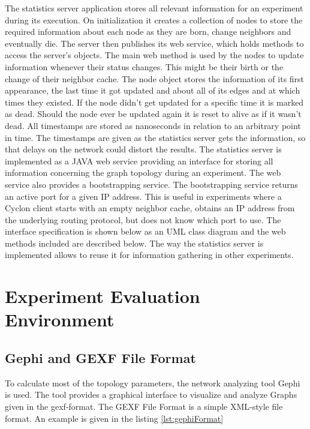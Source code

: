 The statistics server application stores all relevant information for an
experiment during its execution. On initialization it creates a collection of
nodes to store the required information about each node as they are born,
change neighbors and eventually die. The server then publishes its web service,
which holds methods to access the server's objects. The main web method is used
by the nodes to update information whenever their status changes. This might be
their birth or the change of their neighbor cache. The node object stores the
information of its first appearance, the last time it got updated and about all
of its edges and at which times they existed. If the node didn't get updated for
a specific time it is marked as dead. Should the node ever be updated again it is
reset to alive as if it wasn't dead. All timestamps are stored as nanoseconds in
relation to an arbitrary point in time. The timestamps are given as the
statistics server gets the information, so that delays on the network could
distort the results.
The statistics server is implemented as a JAVA web service providing an
interface for storing all information concerning the graph topology during an
experiment. The web service also provides a bootstrapping service. The
bootstrapping service returns an active port for a given IP address. This is
useful in experiments where a Cyclon client starts with an empty neighbor
cache, obtains an IP address from the underlying routing protocol, but does not
know which port to use. The interface specification is shown below
as an UML class diagram and the web methods included are described below.
The way the statistics server is implemented allows to reuse it for information
gathering in other experiments. 

\section{Experiment Evaluation Environment}

\subsection{Gephi and GEXF File Format}
To calculate most of the topology parameters, the network analyzing tool Gephi
\cite{bastian2009gephi} is used. The tool provides a graphical interface to
visualize and analyze Graphs given in the gexf-format. The GEXF File Format is
a simple XML-style file format. An example is given in the listing
\ref{lst:gephiFormat}\\

